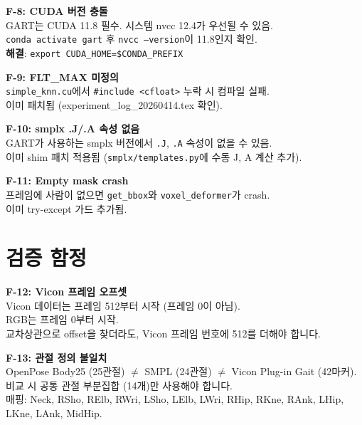\documentclass[11pt, a4paper]{report}
\begin{document}
\begin{failbox}
\textbf{F-8: CUDA 버전 충돌}\\
GART는 CUDA 11.8 필수. 시스템 nvcc 12.4가 우선될 수 있음.\\
\texttt{conda activate gart} 후 \texttt{nvcc --version}이 11.8인지 확인.\\
\textbf{해결}: \texttt{export CUDA\_HOME=\$CONDA\_PREFIX}
\end{failbox}

\begin{failbox}
\textbf{F-9: FLT\_MAX 미정의}\\
\texttt{simple\_knn.cu}에서 \texttt{\#include <cfloat>} 누락 시 컴파일 실패.\\
이미 패치됨 (experiment\_log\_20260414.tex 확인).
\end{failbox}

\begin{failbox}
\textbf{F-10: smplx .J/.A 속성 없음}\\
GART가 사용하는 smplx 버전에서 \texttt{.J}, \texttt{.A} 속성이 없을 수 있음.\\
이미 shim 패치 적용됨 (\texttt{smplx/templates.py}에 수동 J, A 계산 추가).
\end{failbox}

\begin{failbox}
\textbf{F-11: Empty mask crash}\\
프레임에 사람이 없으면 \texttt{get\_bbox}와 \texttt{voxel\_deformer}가 crash.\\
이미 try-except 가드 추가됨.
\end{failbox}


\section{검증 함정}

\begin{failbox}
\textbf{F-12: Vicon 프레임 오프셋}\\
Vicon 데이터는 프레임 512부터 시작 (프레임 0이 아님).\\
RGB는 프레임 0부터 시작.\\
교차상관으로 offset을 찾더라도, Vicon 프레임 번호에 512를 더해야 합니다.
\end{failbox}

\begin{failbox}
\textbf{F-13: 관절 정의 불일치}\\
OpenPose Body25 (25관절) $\neq$ SMPL (24관절) $\neq$ Vicon Plug-in Gait (42마커).\\
비교 시 공통 관절 부분집합 (14개)만 사용해야 합니다.\\
매핑: Neck, RSho, RElb, RWri, LSho, LElb, LWri, RHip, RKne, RAnk, LHip, LKne, LAnk, MidHip.
\end{failbox}
\end{document}
